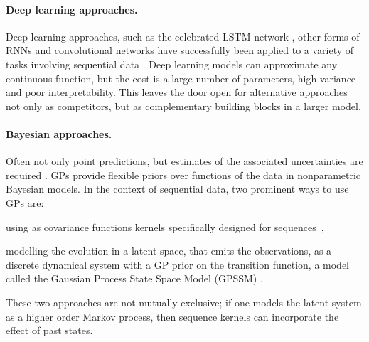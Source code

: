 \documentclass{article}
\begin{document}
 \paragraph{Deep learning approaches.} 
  Deep learning approaches, such as the celebrated LSTM network \cite{hochreiter1997long}, other forms of RNNs \cite{Cho2014} and convolutional networks have successfully been applied to a variety of tasks involving sequential data \cite{Sutskever2014Seq2Seq, Oord2016Wavenet}. Deep learning models can approximate any continuous function, but the cost is a large number of parameters, high variance and poor interpretability.
  This leaves the door open for alternative approaches not only as competitors, but as complementary building blocks in a larger model.
	
  \paragraph{Bayesian approaches.}
  Often not only point predictions, but estimates of the associated uncertainties are required \cite{Ghahramani2013Bayesian}.
  GPs \cite{Rasmussen2006Gaussian} provide flexible priors over functions of the data in nonparametric Bayesian models.
In the context of sequential data, two prominent ways to use GPs are: \begin{enumerate*}[label=(\arabic*)] \item using as covariance functions kernels specifically designed for sequences~\cite{lodhi2002text, Cuturi2011GA, Cuturi2011AR, AlShedivat2017Recurrent}, \item  modelling the evolution in a latent space, that emits the observations, as a discrete dynamical system with a GP prior on the transition function, a model called the Gaussian Process State Space Model (GPSSM) \cite{Frigola2013MCMC, Frigola2014Variational, Mattos2016Recurrent, Eleftheriadis2017Identification, Doerr2018Proba, Ialongo2019Overcoming}. \end{enumerate*}
  These two approaches are not mutually exclusive; if one models the latent system as a higher order Markov process, then sequence kernels can incorporate the effect of past states.
	
\end{document}
